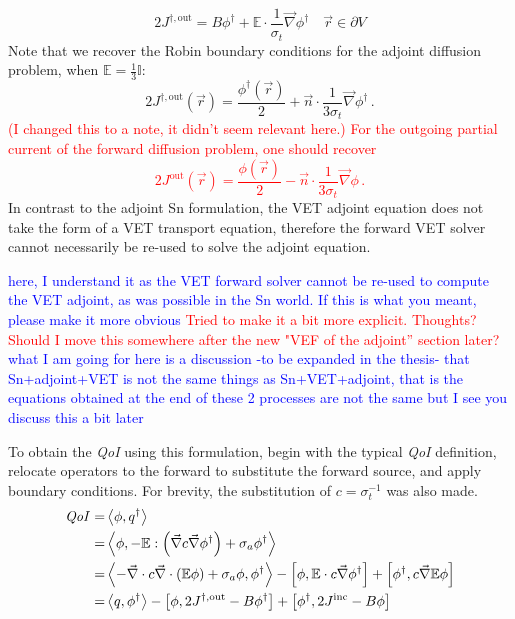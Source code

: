 \documentclass{article}
\newcommand{\vr}{\vec{r}}
\newcommand{\bra}{\left\langle}
\newcommand{\ket}{\right\rangle}
\newcommand{\sbra}{\left[}
\newcommand{\sket}{\right]}
\renewcommand{\div}{\vec{\nabla} \cdot}
\newcommand{\grad}{\vec{\nabla}}
\newcommand{\bound}{\partial V}
\newcommand{\vn}{\vec{n}}
\newcommand{\Edd}{\mathbb{E}}
\newcommand{\sigt}{\sigma_t}
\newcommand{\siga}{\sigma_a}
\newcommand{\isigt}{c}
\newcommand{\scalSource}{q}
\newcommand{\scalResp}{q^\dag}
\newcommand{\qoi}{{\it QoI}\xspace}
\newcommand{\comment}[2]{\marginpar{\textcolor{#2}{$\star$}}\textcolor{#2}{#1}\newline}
\newcommand{\iwh}[1]{\comment{#1}{red}}
\newcommand{\jcr}[1]{\comment{#1}{blue}}
\newcommand{\iwh}[1]{\phantom{a}}
\newcommand{\jcr}[1]{\phantom{a}}
\begin{document}
\begin{equation}
\label{adjVETBC}
2J^{\dag,\text{out}} = B \phi^\dag + 
\Edd \cdot \frac{1}{\sigma_{t} } \vec{\nabla} \phi^\dag   \quad \vr \in \bound
\end{equation}
Note that we recover the Robin boundary conditions for the adjoint diffusion problem, when $\Edd = \tfrac{1}{3} \mathbb{I}$:
\[
2 J^{\dag,\text{out}}(\vr) = \frac{\phi^\dag(\vr)}{2} + \vn \cdot \frac{1}{3\sigt} \grad \phi^\dag \,.
\]
\iwh{ (I changed this to a note, it didn't seem relevant here.) For the outgoing partial current of the forward diffusion problem, one should recover
\[
2 J^{\text{out}}(\vr) = \frac{\phi(\vr)}{2} \boxed{-} \vn \cdot \frac{1}{3\sigt} \grad \phi \,.
\]}
In contrast to the adjoint Sn formulation, the VET adjoint equation does not take the form of a VET transport equation, therefore the forward VET solver 
cannot necessarily be re-used to solve the adjoint equation. 

\jcr{here, I understand it as the VET forward solver cannot be re-used to compute the VET adjoint,
as was possible in the Sn world. If this is what you meant, please make it more obvious}
\iwh{Tried to make it a bit more explicit. Thoughts? Should I move this somewhere after the new "VEF of the adjoint'' section later?} 
\jcr{what I am going for here is a discussion -to be expanded in the thesis- that Sn+adjoint+VET is not the same things as Sn+VET+adjoint, that is the equations obtained at the end
of these 2 processes are not the same but I see you discuss this a bit later}

To obtain the \qoi using this formulation, begin with the typical \qoi definition, relocate operators to the forward to substitute the forward source, and apply boundary conditions.
For brevity, the substitution of $\isigt = \sigt^{-1}$ was also made.
\begin{equation}
\label{VETQoIAdjUnpDeriv}
\begin{split}
\qoi=&\bra \phi , \scalResp \ket \\
=&\bra \phi , - \Edd : \left( \grad \isigt \grad \phi^\dag \right) + \siga \phi^\dag \ket \\
=& \bra - \div \isigt \div \left( \Edd \phi \right) + \siga \phi, \phi^\dag \ket 
- \sbra \phi, \Edd \cdot \isigt \grad \phi^\dag \sket  
+ \sbra \phi^\dag, \isigt \grad \Edd \phi \sket \\
=&\bra \scalSource , \phi^\dag \ket 
- \sbra \phi , 2J^{\dag,\text{out}} - B \phi^\dag \sket + \sbra \phi^\dag, 2J^{\text{inc}} - B \phi  \sket
\end{split}
\end{equation}
\end{document}

